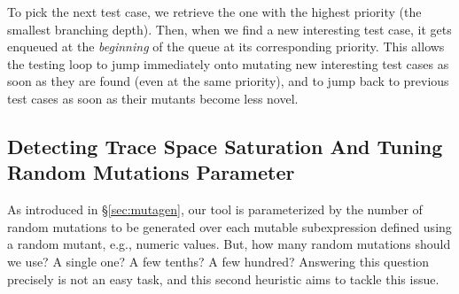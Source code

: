 \documentclass[sigconf, anonymous, review]{acmart}
\newcommand{\mutagen}{\textsc{Mutagen}\xspace}
\begin{document}
To pick the next test case, we retrieve the one with the highest priority (the
smallest branching depth).
%
Then, when we find a new interesting test case, it gets enqueued at the
\emph{beginning} of the queue at its corresponding priority.
%
This allows the testing loop to jump immediately onto mutating new interesting
test cases as soon as they are found (even at the same priority), and to jump
back to previous test cases as soon as their mutants become less novel.




\subsection{Detecting Trace Space Saturation And Tuning Random Mutations Parameter}

As introduced in \S \ref{sec:mutagen}, our tool is parameterized by the
number of random mutations to be generated over each mutable subexpression
defined using a random mutant, e.g., numeric values.
%
But, how many random mutations should we use? A single one? A few tenths? A few
hundred?
%
Answering this question precisely is not an easy task, and this second heuristic
aims to tackle this issue.
\end{document}
